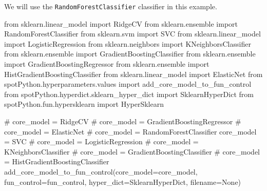 \documentclass[
  letterpaper,
  DIV=11,
  numbers=noendperiod]{scrreprt}
\newenvironment{Shaded}{\begin{snugshade}}{\end{snugshade}}
\newcommand{\CommentTok}[1]{\textcolor[rgb]{0.37,0.37,0.37}{#1}}
\newcommand{\ImportTok}[1]{\textcolor[rgb]{0.00,0.46,0.62}{#1}}
\newcommand{\NormalTok}[1]{\textcolor[rgb]{0.00,0.23,0.31}{#1}}
\newcommand{\OperatorTok}[1]{\textcolor[rgb]{0.37,0.37,0.37}{#1}}
\newcommand{\VariableTok}[1]{\textcolor[rgb]{0.07,0.07,0.07}{#1}}
\begin{document}
We will use the \texttt{RandomForestClassifier} classifier in this
example.

\begin{Shaded}
\begin{Highlighting}[]
\ImportTok{from}\NormalTok{ sklearn.linear\_model }\ImportTok{import}\NormalTok{ RidgeCV}
\ImportTok{from}\NormalTok{ sklearn.ensemble }\ImportTok{import}\NormalTok{ RandomForestClassifier}
\ImportTok{from}\NormalTok{ sklearn.svm }\ImportTok{import}\NormalTok{ SVC}
\ImportTok{from}\NormalTok{ sklearn.linear\_model }\ImportTok{import}\NormalTok{ LogisticRegression}
\ImportTok{from}\NormalTok{ sklearn.neighbors }\ImportTok{import}\NormalTok{ KNeighborsClassifier}
\ImportTok{from}\NormalTok{ sklearn.ensemble }\ImportTok{import}\NormalTok{ GradientBoostingClassifier}
\ImportTok{from}\NormalTok{ sklearn.ensemble }\ImportTok{import}\NormalTok{ GradientBoostingRegressor}
\ImportTok{from}\NormalTok{ sklearn.ensemble }\ImportTok{import}\NormalTok{ HistGradientBoostingClassifier}
\ImportTok{from}\NormalTok{ sklearn.linear\_model }\ImportTok{import}\NormalTok{ ElasticNet}
\ImportTok{from}\NormalTok{ spotPython.hyperparameters.values }\ImportTok{import}\NormalTok{ add\_core\_model\_to\_fun\_control}
\ImportTok{from}\NormalTok{ spotPython.hyperdict.sklearn\_hyper\_dict }\ImportTok{import}\NormalTok{ SklearnHyperDict}
\ImportTok{from}\NormalTok{ spotPython.fun.hypersklearn }\ImportTok{import}\NormalTok{ HyperSklearn}
\end{Highlighting}
\end{Shaded}

\begin{Shaded}
\begin{Highlighting}[]
\CommentTok{\# core\_model  = RidgeCV}
\CommentTok{\# core\_model = GradientBoostingRegressor}
\CommentTok{\# core\_model = ElasticNet}
\CommentTok{\# core\_model = RandomForestClassifier}
\NormalTok{core\_model }\OperatorTok{=}\NormalTok{ SVC}
\CommentTok{\# core\_model = LogisticRegression}
\CommentTok{\# core\_model = KNeighborsClassifier}
\CommentTok{\# core\_model = GradientBoostingClassifier}
\CommentTok{\# core\_model = HistGradientBoostingClassifier}
\NormalTok{add\_core\_model\_to\_fun\_control(core\_model}\OperatorTok{=}\NormalTok{core\_model,}
\NormalTok{                              fun\_control}\OperatorTok{=}\NormalTok{fun\_control,}
\NormalTok{                              hyper\_dict}\OperatorTok{=}\NormalTok{SklearnHyperDict,}
\NormalTok{                              filename}\OperatorTok{=}\VariableTok{None}\NormalTok{)}
\end{Highlighting}
\end{Shaded}
\end{document}
